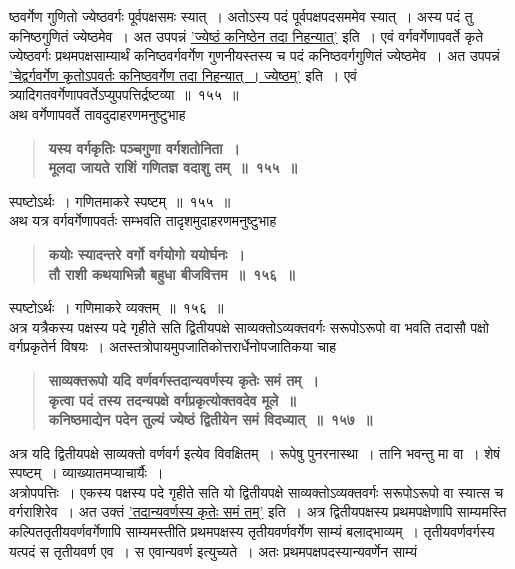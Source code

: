 \documentclass[11pt, openany]{book}
\begin{document}
\newpage

\begin{sloppypar}
\noindent ष्ठवर्गेण गुणितो ज्येष्ठवर्गः पूर्वपक्षसमः स्यात्~। अतोऽस्य पदं पूर्वपक्षपदसममेव स्यात्~। अस्य पदं तु कनिष्ठगुणितं ज्येष्ठमेव~। अत उपपन्नं \hyperref[10.154]{'ज्येष्ठं कनिष्ठेन तदा निहन्यात्'} इति~। एवं वर्गवर्गेणापवर्ते कृते ज्येष्ठवर्गः प्रथमपक्षसाम्यार्थं कनिष्ठवर्गवर्गेण गुणनीयस्तस्य च पदं कनिष्ठवर्गगुणितं ज्येष्ठमेव~। अत उपपन्नं \hyperref[10.154]{'चेद्वर्गवर्गेण कृतोऽपवर्तः कनिष्ठवर्गेण तदा निहन्यात्~। ज्येष्ठम्'} इति~। एवं त्र्यादिगतवर्गेणापवर्तेऽप्युपपत्तिर्द्रष्टव्या~॥~१५५~॥\\

{\small अथ वर्गेणापवर्ते तावदुदाहरणमनुष्टुभाह\textendash }

 \label{10.155}
\begin{quote}
{\large \textbf{{\color{purple}यस्य वर्गकृतिः पञ्चगुणा वर्गशतोनिता~।\\
मूलदा जायते राशिं गणितज्ञ वदाशु तम्~॥~१५५~॥}}}
\end{quote}

स्पष्टोऽर्थः~। गणितमाकरे स्पष्टम्~॥~१५५~॥\\

{\small अथ यत्र वर्गवर्गेणापवर्तः सम्भवति तादृशमुदाहरणमनुष्टुभाह\textendash }

 \label{10.156}
\begin{quote}
{\large \textbf{{\color{purple}कयोः स्यादन्तरे वर्गो वर्गयोगो ययोर्घनः~।\\
तौ राशी कथयाभिन्नौ बहुधा बीजवित्तम~॥~१५६~॥}}}
\end{quote}

स्पष्टोऽर्थः~। गणिमाकरे व्यक्तम्~॥~१५६~॥\\

{\small अत्र यत्रैकस्य पक्षस्य पदे गृहीते सति द्वितीयपक्षे साव्यक्तोऽव्यक्तवर्गः सरूपोऽरूपो वा भवति तदासौ पक्षो वर्गप्रकृतेर्न विषयः~। अतस्तत्रोपायमुपजातिकोत्तरार्धेनोपजातिकया चाह\textendash }

 \label{10.157}
\begin{quote}
{\large \textbf{{\color{purple}साव्यक्तरूपो यदि वर्णवर्गस्तदान्यवर्णस्य कृतेः समं तम्~।\\
कृत्वा पदं तस्य तदन्यपक्षे वर्गप्रकृत्योक्तवदेव मूले~॥\\
कनिष्ठमाद्येन पदेन तुल्यं ज्येष्ठं द्वितीयेन समं विदध्यात्~॥~१५७~॥}}}
\end{quote}

अत्र यदि द्वितीयपक्षे साव्यक्तो वर्णवर्ग इत्येव विवक्षितम्~। रूपेषु पुनरनास्था~। तानि भवन्तु मा वा~। शेषं स्पष्टम्~। व्याख्यातमप्याचार्यैः~। \\

अत्रोपपत्तिः~। एकस्य पक्षस्य पदे गृहीते सति यो द्वितीयपक्षे साव्यक्तोऽव्यक्तवर्गः सरूपोऽरूपो वा स्यात्स च वर्गराशिरेव~। अत उक्तं \hyperref[10.157]{'तदान्यवर्णस्य कृतेः समं तम्'} इति~। अत्र द्वितीयपक्षस्य प्रथमपक्षेणापि साम्यमस्ति कल्पिततृतीयवर्णवर्गेणापि साम्यमस्तीति प्रथमपक्षस्य तृतीयवर्णवर्गेण साम्यं बलाद्भाव्यम्~। तृतीयवर्णवर्गस्य यत्पदं स तृतीयवर्ण एव~। स एवान्यवर्ण इत्युच्यते~। अतः प्रथमपक्षपदस्यान्यवर्णेन साम्यं
\end{sloppypar}
\end{document}
